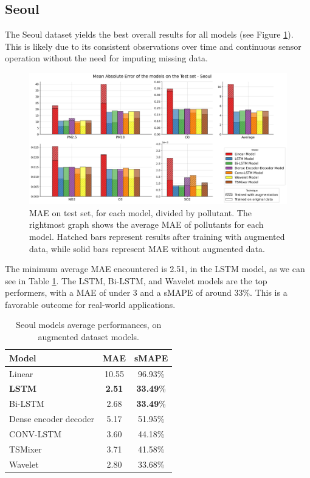 \subsection{Seoul}

The Seoul dataset yields the best overall results for all models (see Figure \ref{fig:seoul_results}). This is likely due to its consistent observations over time and continuous sensor operation without the need for imputing missing data.

\begin{figure}[h]
    \centering
    \includegraphics[width=1\linewidth]{images/Seoul_results.png}
    \caption{MAE on test set, for each model, divided by pollutant. The rightmost graph shows the average MAE of pollutants for each model. Hatched bars represent results after training with augmented data, while solid bars represent MAE without augmented data.}
    \label{fig:seoul_results}
\end{figure}

The minimum average MAE encountered is 2.51, in the LSTM model, as we can see in Table \ref{tab:Seoul performances}.
The LSTM, Bi-LSTM, and Wavelet models are the top performers, with a MAE of under 3 and a sMAPE of around 33\%. This is a favorable outcome for real-world applications.

\begin{table}[h]
    \centering
    \begin{tabular}{lcc}
        \toprule
        \textbf{Model} & \textbf{MAE} & \textbf{sMAPE} \\ 
        \midrule
        Linear & 10.55 & 96.93\% \\
        \textbf{LSTM} & \textbf{2.51} & \textbf{33.49}\% \\
        Bi-LSTM & 2.68 & \textbf{33.49}\% \\
        Dense encoder decoder & 5.17 & 51.95\% \\
        CONV-LSTM & 3.60 & 44.18\% \\
        TSMixer & 3.71 & 41.58\% \\
        Wavelet & 2.80 & 33.68\% \\
        \bottomrule
    \end{tabular}
    \caption{Seoul models average performances, on augmented dataset models.}
    \label{tab:Seoul performances}
\end{table}

